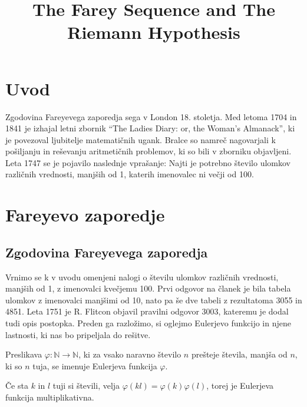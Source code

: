 \documentclass[mat1]{fmfdelo}
\title{The Farey Sequence and The Riemann Hypothesis}
\begin{document}
\section{Uvod}
Zgodovina Fareyevega zaporedja sega v London 18. stoletja. Med letoma 1704 in 1841 je izhajal letni zbornik ``The Ladies Diary: or, the Woman's Almanack'', ki je povezoval ljubitelje matematičnih ugank. Bralce so namreč nagovarjali k pošiljanju in reševanju aritmetičnih problemov, ki so bili v zborniku objavljeni. Leta 1747 se je pojavilo naslednje vprašanje: Najti je potrebno število ulomkov različnih vrednosti, manjših od 1, katerih imenovalec ni večji od 100.


\section{Fareyevo zaporedje}

\subsection{Zgodovina Fareyevega zaporedja}

Vrnimo se k v uvodu omenjeni nalogi o številu ulomkov različnih vrednosti, manjših od 1, z imenovalci kvečjemu 100. Prvi odgovor na članek je bila tabela ulomkov z imenovalci manjšimi od 10, nato pa še dve tabeli z rezultatoma 3055 in 4851. Leta 1751 je R. Flitcon objavil pravilni odgovor 3003, kateremu je dodal tudi opis postopka. Preden ga razložimo, si oglejmo Eulerjevo funkcijo in njene lastnosti, ki nas bo pripeljala do rešitve. 


\begin{definicija}
Preslikava \( \varphi \colon \mathbb{N} \rightarrow  \mathbb{N}\), ki za vsako naravno število $n$ prešteje števila, manjša od $n$, ki so $n$ tuja, se imenuje Eulerjeva funkcija $\varphi$.
\end{definicija}

\begin{trditev}
\label{trd:MultipEuler}
Če sta $k$ in $l$ tuji si števili, velja $\varphi (kl) = \varphi (k) \varphi (l)$, torej je Eulerjeva funkcija multiplikativna.
\end{trditev}
\end{document}
